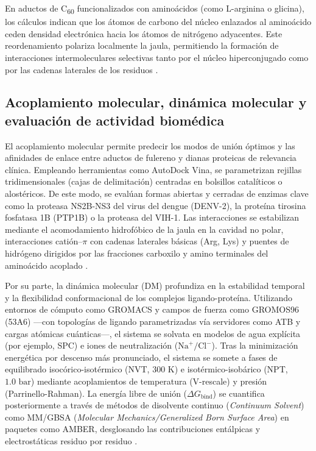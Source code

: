 En aductos de C\textsubscript{60} funcionalizados con aminoácidos (como L-arginina o glicina), los cálculos indican que los átomos de carbono del núcleo enlazados al aminoácido ceden densidad electrónica hacia los átomos de nitrógeno adyacentes. Este reordenamiento polariza localmente la jaula, permitiendo la formación de interacciones intermoleculares selectivas tanto por el núcleo hiperconjugado como por las cadenas laterales de los residuos \cite{moncada2008caracterizacion, gaur2021biomedical}.

\subsection{Acoplamiento molecular, dinámica molecular y evaluación de actividad biomédica}
El acoplamiento molecular permite predecir los modos de unión óptimos y las afinidades de enlace entre aductos de fulereno y dianas proteicas de relevancia clínica. Empleando herramientas como AutoDock Vina, se parametrizan rejillas tridimensionales (cajas de delimitación) centradas en bolsillos catalíticos o alostéricos. De este modo, se evalúan formas abiertas y cerradas de enzimas clave como la proteasa NS2B-NS3 del virus del dengue (DENV-2), la proteína tirosina fosfatasa 1B (PTP1B) o la proteasa del VIH-1. Las interacciones se estabilizan mediante el acomodamiento hidrofóbico de la jaula en la cavidad no polar, interacciones catión--$\pi$ con cadenas laterales básicas (Arg, Lys) y puentes de hidrógeno dirigidos por las fracciones carboxilo y amino terminales del aminoácido acoplado \cite{nelson2022principios,jiang2015synthesis, wang2024strain}.

Por su parte, la dinámica molecular (DM) profundiza en la estabilidad temporal y la flexibilidad conformacional de los complejos ligando-proteína. Utilizando entornos de cómputo como GROMACS y campos de fuerza como GROMOS96 (53A6) —con topologías de ligando parametrizadas vía servidores como ATB y cargas atómicas cuánticas—, el sistema se solvata en modelos de agua explícita (por ejemplo, SPC) e iones de neutralización ($\text{Na}^+/\text{Cl}^-$). Tras la minimización energética por descenso más pronunciado, el sistema se somete a fases de equilibrado isocórico-isotérmico (NVT, $300\text{ K}$) e isotérmico-isobárico (NPT, $1.0\text{ bar}$) mediante acoplamientos de temperatura (V-rescale) y presión (Parrinello-Rahman). La energía libre de unión ($\Delta G_{\text{bind}}$) se cuantifica posteriormente a través de métodos de disolvente continuo (\textit{Continuum Solvent}) como MM/GBSA (\textit{Molecular Mechanics/Generalized Born Surface Area}) en paquetes como AMBER, desglosando las contribuciones entálpicas y electrostáticas residuo por residuo \cite{nelson2022principios, liu2023fullerene}.

